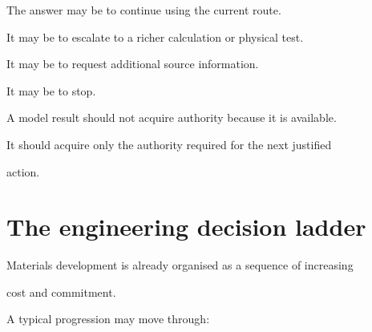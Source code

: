 \documentclass[11pt,a4paper,oneside]{report}
\begin{document}
The answer may be to continue using the current route.



It may be to escalate to a richer calculation or physical test.



It may be to request additional source information.



It may be to stop.





\begin{governingrule}



A model result should not acquire authority because it is available.



It should acquire only the authority required for the next justified

action.



\end{governingrule}





\section{The engineering decision ladder}



Materials development is already organised as a sequence of increasing

cost and commitment.



A typical progression may move through:
\end{document}
